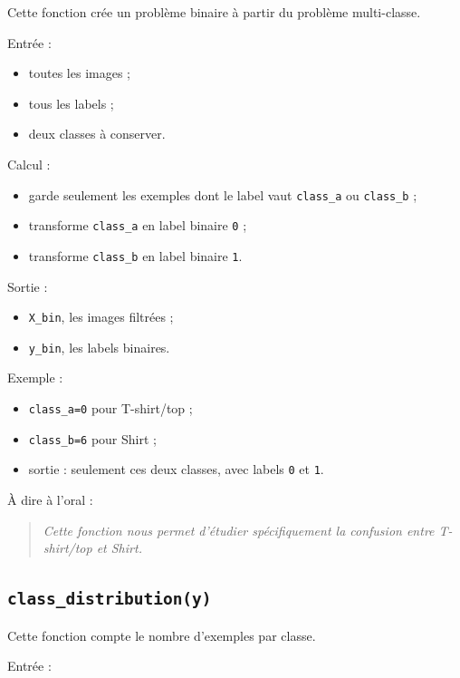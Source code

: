 \documentclass[11pt,a4paper]{article}
\begin{document}
Cette fonction crée un problème binaire à partir du problème multi-classe.

Entrée :

\begin{itemize}
\item toutes les images ;
\item tous les labels ;
\item deux classes à conserver.
\end{itemize}

Calcul :

\begin{itemize}
\item garde seulement les exemples dont le label vaut \texttt{class\_a} ou \texttt{class\_b} ;
\item transforme \texttt{class\_a} en label binaire \texttt{0} ;
\item transforme \texttt{class\_b} en label binaire \texttt{1}.
\end{itemize}

Sortie :

\begin{itemize}
\item \texttt{X\_bin}, les images filtrées ;
\item \texttt{y\_bin}, les labels binaires.
\end{itemize}

Exemple :

\begin{itemize}
\item \texttt{class\_a=0} pour T-shirt/top ;
\item \texttt{class\_b=6} pour Shirt ;
\item sortie : seulement ces deux classes, avec labels \texttt{0} et \texttt{1}.
\end{itemize}

À dire à l'oral :

\begin{quote}
\itshape Cette fonction nous permet d'étudier spécifiquement la confusion entre T-shirt/top et Shirt.
\end{quote}

\subsection{\texttt{class\_distribution(y)}}

Cette fonction compte le nombre d'exemples par classe.

Entrée :
\end{document}
